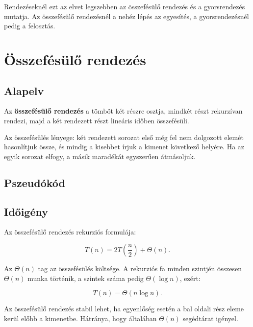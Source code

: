 Rendezéseknél ezt az elvet legszebben az összefésülő rendezés és a gyorsrendezés mutatja. Az összefésülő rendezésnél a nehéz lépés az egyesítés, a gyorsrendezésnél pedig a felosztás.



\section{Összefésülő rendezés}

\subsection{Alapelv}

Az \textbf{összefésülő rendezés} a tömböt két részre osztja, mindkét részt rekurzívan rendezi, majd a két rendezett részt lineáris időben összefésüli.

Az összefésülés lényege: két rendezett sorozat első még fel nem dolgozott elemét hasonlítjuk össze, és mindig a kisebbet írjuk a kimenet következő helyére. Ha az egyik sorozat elfogy, a másik maradékát egyszerűen átmásoljuk.

\subsection{Pszeudókód}



\subsection{Időigény}

Az összefésülő rendezés rekurziós formulája:

\[
T(n)=2T\left(\frac{n}{2}\right)+\Theta(n).
\]

Az $\Theta(n)$ tag az összefésülés költsége. A rekurziós fa minden szintjén összesen $\Theta(n)$ munka történik, a szintek száma pedig $\Theta(\log n)$, ezért:

\[
T(n)=\Theta(n\log n).
\]

Az összefésülő rendezés stabil lehet, ha egyenlőség esetén a bal oldali rész eleme kerül előbb a kimenetbe. Hátránya, hogy általában $\Theta(n)$ segédtárat igényel.

